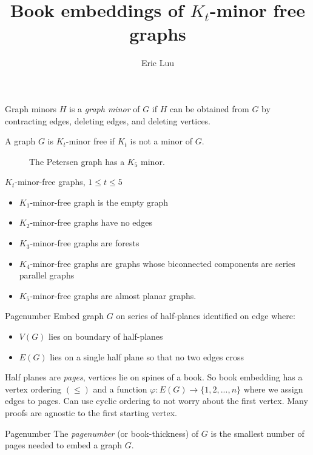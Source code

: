 \documentclass[]{beamer}
\title{Book embeddings of $K_t$-minor free graphs}
\author{Eric Luu}
\begin{document}
\frame{\titlepage}
\begin{frame}{Graph minors}
	$H$ is a \textit{graph minor} of $G$ if $H$ can be obtained from $G$ by contracting edges, deleting edges, and deleting vertices.
	\begin{definition}
		A graph $G$ is $K_t$-minor free if $K_t$ is not a minor of $G$.
	\end{definition}
	\begin{figure}[h]
		\centering
		
		
		\caption{The Petersen graph has a $K_5$ minor.}\label{P10contraction}
	\end{figure}
\end{frame}

\begin{frame}{$K_t$-minor-free graphs, $ 1 \leq t \leq 5$}
	\begin{itemize}
		\item $K_1$-minor-free graph is the empty graph
		\item $K_2$-minor-free graphs have no edges
		\item $K_3$-minor-free graphs are forests
		\item $K_4$-minor-free graphs are graphs whose biconnected components are series parallel graphs
		\item $K_5$-minor-free graphs are almost planar graphs.
	\end{itemize}
\end{frame}
\begin{frame}[allowframebreaks]{Pagenumber}
	Embed graph $G$ on series of half-planes identified on edge where:
	\begin{itemize}
		\item $V(G)$ lies on boundary of half-planes
		\item $E(G)$ lies on a single half plane so that no two edges cross
	\end{itemize}
	Half planes are \textit{pages}, vertices lie on spines of a book. 
	So book embedding has a vertex ordering $(\leq)$ and a function $\varphi: E(G) \rightarrow \lbrace 1, 2, ..., n \rbrace$ where we assign edges to pages.
	Can use cyclic ordering to not worry about the first vertex. Many proofs are agnostic to the first starting vertex.
	\begin{block}{Pagenumber}
		The \textit{pagenumber} (or book-thickness) of $G$ is the smallest number of pages needed to embed a graph $G$.
	\end{block}
\end{frame}
\end{document}

